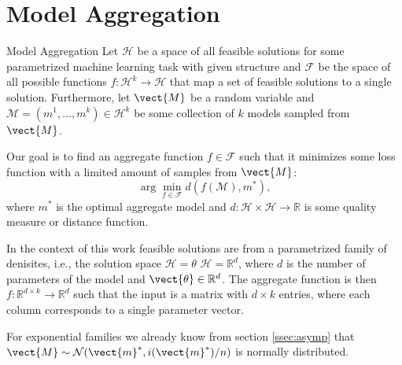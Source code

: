 
\chapter{Model Aggregation}
\label{chapter:ch3}

\begin{definition}[parbox=false]{Model Aggregation}
    Let $\mathcal{H}$ be a space of all feasible solutions for some parametrized machine learning task with given structure and $\mathcal{F}$ be the space of all possible functions $f: \mathcal{H}^k \rightarrow \mathcal{H}$ that map a set of feasible solutions to a single solution.
    Furthermore, let $\vect{M}$ be a random variable and $\mathcal{M} = (m^1, \ldots, m^k) \in \mathcal{H}^k$ be some collection of $k$ models sampled from $\vect{M}$.

    Our goal is to find an aggregate function $f \in \mathcal{F}$ such that it minimizes some loss function with a limited amount of samples from $\vect{M}$:
    \begin{equation}
        \label{eq:regret}
        \arg\min_{f \in \mathcal{F}} d(f(\mathcal{\mathcal{M}}), m^*),
    \end{equation}
    where $m^*$ is the optimal aggregate model and $d: \mathcal{H} \times \mathcal{H} \rightarrow \mathbb{R}$ is some quality measure or distance function.
\end{definition}

In the context of this work feasible solutions are from a parametrized family of denisites, i.e., the solution space $\mathcal{H} = \theta$
$\mathcal{H} = \mathbb{R}^d$, where $d$ is the number of parameters of the model and $\vect{\theta} \in \mathbb{R}^d$.
The aggregate function is then $f: \mathbb{R}^{d \times k} \rightarrow \mathbb{R}^{d}$ such that the input is a matrix with $d \times k$ entries, where each column corresponds to a single parameter vector.

For exponential families we already know from section \ref{ssec:asymp} that $\vect{M} \sim \mathcal{N}(\vect{m}^*, i(\vect{m}^*)/n)$ is normally distributed.

